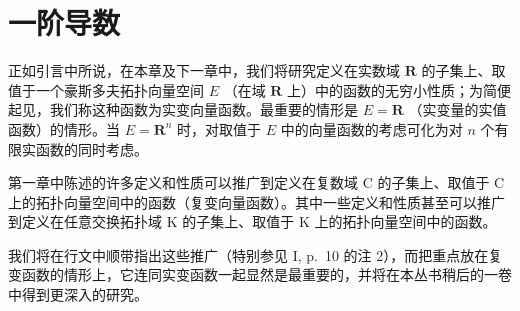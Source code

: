 \section{一阶导数}

正如引言中所说，在本章及下一章中，我们将研究定义在实数域 \(\mathbf{R}\) 的子集上、取值于一个豪斯多夫拓扑向量空间 \(E\) （在域 \(\mathbf{R}\) 上）中的函数的无穷小性质；为简便起见，我们称这种函数为实变向量函数。最重要的情形是 \(E = \mathbf{R}\) （实变量的实值函数）的情形。当 \(E = \mathbf{R}^n\) 时，对取值于 \(E\) 中的向量函数的考虑可化为对 \(n\) 个有限实函数的同时考虑。

第一章中陈述的许多定义和性质可以推广到定义在复数域 C 的子集上、取值于 C 上的拓扑向量空间中的函数（复变向量函数）。其中一些定义和性质甚至可以推广到定义在任意交换拓扑域 K 的子集上、取值于 K 上的拓扑向量空间中的函数。

我们将在行文中顺带指出这些推广（特别参见 I, p.~10 的注 2），而把重点放在复变函数的情形上，它连同实变函数一起显然是最重要的，并将在本丛书稍后的一卷中得到更深入的研究。

